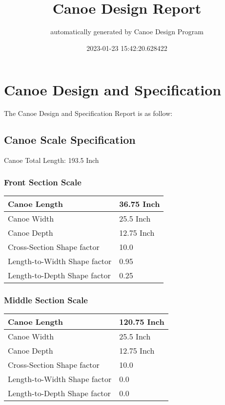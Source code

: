 \documentclass{article}%
\title{Canoe Design Report}%
\author{automatically generated by Canoe Design Program}%
\date{2023{-}01{-}23 15:42:20.628422}%
\begin{document}
%
\normalsize%
\selectfont%
\fontsize{12}{15}%
\pagestyle{fancy}%
\maketitle%
\thispagestyle{fancy}%
\section{Canoe Design and Specification}%
\label{sec:CanoeDesignandSpecification}%
The Canoe Design and Specification Report is as follow: %
\subsection{Canoe Scale Specification}%
\label{subsec:CanoeScaleSpecification}%
Canoe Total Length: 193.5 Inch%
\subsubsection{Front Section Scale}%
\label{ssubsec:FrontSectionScale}%
\renewcommand{\arraystretch}{1.5}%
\begin{tabular}{|l|l|}%
\hline%
Canoe Length&36.75 Inch\\%
\hline%
Canoe Width&25.5 Inch\\%
\hline%
Canoe Depth&12.75 Inch\\%
\hline%
Cross{-}Section Shape factor&10.0\\%
\hline%
Length{-}to{-}Width Shape factor&0.95\\%
\hline%
Length{-}to{-}Depth Shape factor&0.25\\%
\hline%
\end{tabular}

%
\subsubsection{Middle Section Scale}%
\label{ssubsec:MiddleSectionScale}%
\renewcommand{\arraystretch}{1.5}%
\begin{tabular}{|l|l|}%
\hline%
Canoe Length&120.75 Inch\\%
\hline%
Canoe Width&25.5 Inch\\%
\hline%
Canoe Depth&12.75 Inch\\%
\hline%
Cross{-}Section Shape factor&10.0\\%
\hline%
Length{-}to{-}Width Shape factor&0.0\\%
\hline%
Length{-}to{-}Depth Shape factor&0.0\\%
\hline%
\end{tabular}
\end{document}
